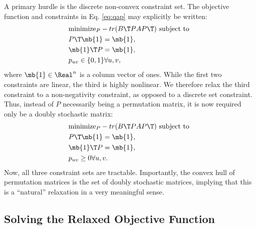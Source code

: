 \documentclass[10pt,journal,cspaper,compsoc]{IEEEtran}
\newcommand{\PmcP}{P \in \mc{P}}
\begin{document}
A primary hurdle is the discrete non-convex constraint set.  The objective function and constraints in Eq. \eqref{eq:qap} may explicitly be written:
\begin{align} 
	&\text{minimize}_{P} - tr(B\T PAP\T) \text{ subject to } \nonumber \\
	& P\T\mb{1}=\mb{1}, \nonumber \\
	&\mb{1}\T P=\mb{1}, \nonumber \\
	&p_{uv} \in \{0,1\} \forall u,v, \label{eq:obj}
\end{align}
where $\mb{1} \in \Real^n$ is a column vector of ones.  While the first two constraints are linear, the third is highly nonlinear.  We therefore relax the third constraint to a non-negativity constraint, as opposed to a discrete set constraint.  Thus, instead of $P$ necessarily being a permutation matrix, it is now required only be a doubly stochastic matrix:
\begin{align} 
	&\text{minimize}_{P} - tr(B\T PAP\T) \text{ subject to } \nonumber \\
	& P\T\mb{1}=\mb{1}, \nonumber \\
	&\mb{1}\T P=\mb{1}, \nonumber \\
	&p_{uv} \geq 0 \forall u,v. \label{eq:aobj}
\end{align}
Now, all three constraint sets are tractable.  Importantly, the convex hull of permutation matrices is the set of doubly stochastic matrices, implying that this is a ``natural'' relaxation in a very meaningful sense.




\subsection{Solving the Relaxed Objective Function} %
\label{ssub:graph_matching}

\end{document}
